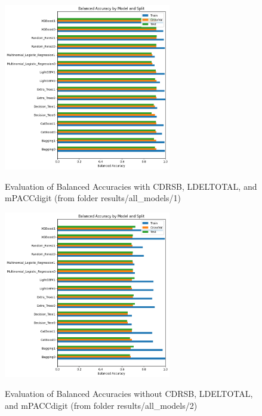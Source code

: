 \begin{figure}[H]
	\centering
	\includegraphics[width=0.65\textwidth]{images/1_Evaluation.png}
	\label{fig:Evaluation with CDRSB, LDELTOTAL, and mPACCdigit}
	\caption{Evaluation of Balanced Accuracies with CDRSB, LDELTOTAL, and mPACCdigit (from folder results/all\_models/1)}
\end{figure}

\begin{figure}[H]
	\centering
	\includegraphics[width=0.65\textwidth]{images/2_Evaluation.png}
	\label{fig:Evaluation without CDRSB, LDELTOTAL, and mPACCdigit}
	\caption{Evaluation of Balanced Accuracies without CDRSB, LDELTOTAL, and mPACCdigit (from folder results/all\_models/2)}
\end{figure}

\newpage

